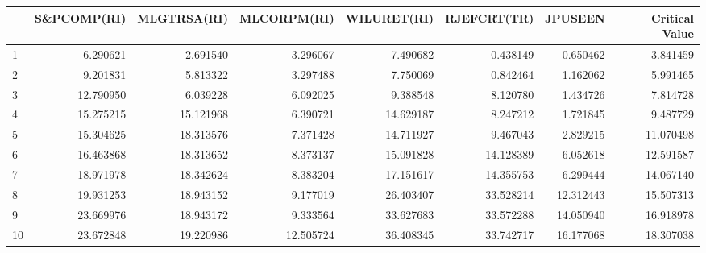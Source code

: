 \begin{tabular}{lrrrrrrr}
\toprule
{} &  S\&PCOMP(RI) &  MLGTRSA(RI) &  MLCORPM(RI) &  WILURET(RI) &  RJEFCRT(TR) &    JPUSEEN &  Critical Value \\
\midrule
1  &     6.290621 &     2.691540 &     3.296067 &     7.490682 &     0.438149 &   0.650462 &        3.841459 \\
2  &     9.201831 &     5.813322 &     3.297488 &     7.750069 &     0.842464 &   1.162062 &        5.991465 \\
3  &    12.790950 &     6.039228 &     6.092025 &     9.388548 &     8.120780 &   1.434726 &        7.814728 \\
4  &    15.275215 &    15.121968 &     6.390721 &    14.629187 &     8.247212 &   1.721845 &        9.487729 \\
5  &    15.304625 &    18.313576 &     7.371428 &    14.711927 &     9.467043 &   2.829215 &       11.070498 \\
6  &    16.463868 &    18.313652 &     8.373137 &    15.091828 &    14.128389 &   6.052618 &       12.591587 \\
7  &    18.971978 &    18.342624 &     8.383204 &    17.151617 &    14.355753 &   6.299444 &       14.067140 \\
8  &    19.931253 &    18.943152 &     9.177019 &    26.403407 &    33.528214 &  12.312443 &       15.507313 \\
9  &    23.669976 &    18.943172 &     9.333564 &    33.627683 &    33.572288 &  14.050940 &       16.918978 \\
10 &    23.672848 &    19.220986 &    12.505724 &    36.408345 &    33.742717 &  16.177068 &       18.307038 \\
\bottomrule
\end{tabular}
